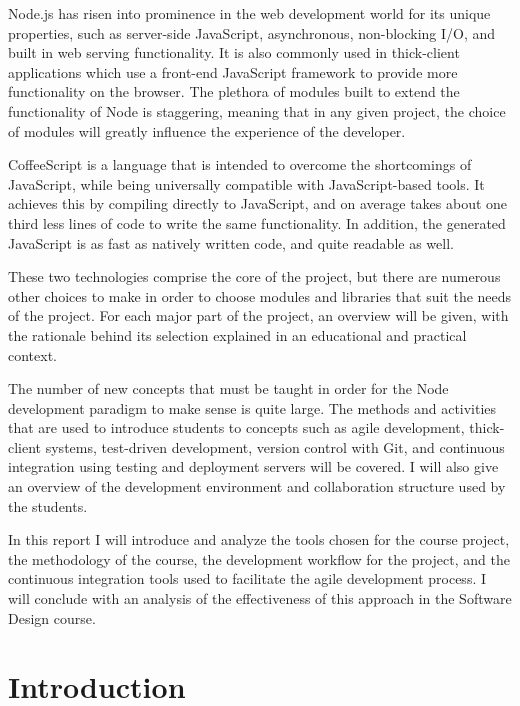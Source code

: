 \documentclass[12pt]{article}
\begin{document}
Node.js has risen into prominence in the web development world for its unique properties, such as server-side JavaScript, asynchronous, non-blocking I/O, and built in web serving functionality. It is also commonly used in thick-client applications which use a front-end JavaScript framework to provide more functionality on the browser. The plethora of modules built to extend the functionality of Node is staggering, meaning that in any given project, the choice of modules will greatly influence the experience of the developer.
	
CoffeeScript is a language that is intended to overcome the shortcomings of JavaScript, while being universally compatible with JavaScript-based tools. It achieves this by compiling directly to JavaScript, and on average takes about one third less lines of code to write the same functionality. In addition, the generated JavaScript is as fast as natively written code, and quite readable as well.
	
These two technologies comprise the core of the project, but there are numerous other choices to make in order to choose modules and libraries that suit the needs of the project. For each major part of the project, an overview will be given, with the rationale behind its selection explained in an educational and practical context.
	
The number of new concepts that must be taught in order for the Node development paradigm to make sense is quite large. The methods and activities that are used to introduce students to concepts such as agile development, thick-client systems, test-driven development, version control with Git, and continuous integration using testing and deployment servers will be covered. I will also give an overview of the development environment and collaboration structure used by the students.
	
In this report I will introduce and analyze the tools chosen for the course project, the methodology of the course, the development workflow for the project, and the continuous integration tools used to facilitate the agile development process. I will conclude with an analysis of the effectiveness of this approach in the Software Design course.


\newpage

\setcounter{page}{1}


\section{Introduction}\label{sec:introduction}
\end{document}

